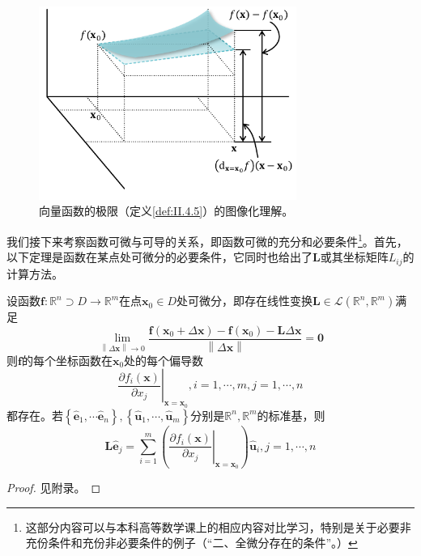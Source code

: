 \documentclass[../main.tex]{subfiles}
\begin{document}
\begin{figure}[ht]
    \centering
    \includegraphics[width=0.75\textwidth]{images/II.4.7.pdf}
    \caption{向量函数的极限（定义\ref{def:II.4.5}）的图像化理解。}
    \label{fig:II.4.7}
\end{figure}

我们接下来考察函数可微与可导的关系，即函数可微的充分和必要条件\footnote{这部分内容可以与本科高等数学课上的相应内容对比学习，特别是关于必要非充份条件和充份非必要条件的例子（“二、全微分存在的条件”\cite[p.~20]{华工高数2009下}。）}。首先，以下定理是函数在某点处可微分的必要条件，它同时也给出了$\mathbf{L}$或其坐标矩阵$L_{ij}$的计算方法。

\begin{theorem}\label{thm:II.4.7}
    设函数$\mathbf{f}:\mathbb{R}^n\supset D\rightarrow\mathbb{R}^m$在点$\mathbf{x}_0\in D$处可微分，即存在线性变换$\mathbf{L}\in\mathcal{L}\left(\mathbb{R}^n,\mathbb{R}^m\right)$满足
    \[
        \lim_{\left\|\Delta\mathbf{x}\right\|\to 0}\frac{\mathbf{f}\left(\mathbf{x}_0+\Delta \mathbf{x}\right)-\mathbf{f}\left(\mathbf{x}_0\right)-\mathbf{L}\Delta\mathbf{x}}{\left\|\Delta\mathbf{x}\right\|}=\mathbf{0}
    \]
    则$\mathbf{f}$的每个坐标函数在$\mathbf{x}_0$处的每个偏导数
    \[
        \left.\frac{\partial f_i\left(\mathbf{x}\right)}{\partial x_j}\right|_{\mathbf{x}=\mathbf{x}_0},i=1,\cdots,m,j=1,\cdots,n
    \]
    都存在。若$\left\{\mathbf{\hat{e}}_1,\cdots\mathbf{\hat{e}}_n\right\},\left\{\mathbf{\hat{u}}_1,\cdots,\mathbf{\hat{u}}_m\right\}$分别是$\mathbb{R}^n,\mathbb{R}^m$的标准基，则
    \[
        \mathbf{L\hat{e}}_j=\sum_{i=1}^m\left(\left.\frac{\partial f_i\left(\mathbf{x}\right)}{\partial x_j}\right|_{\mathbf{x}=\mathbf{x}_0}\right)\mathbf{\hat{u}}_i,j=1,\cdots,n
    \]
\end{theorem}
\begin{proof}
    见附录。
\end{proof}
\end{document}
